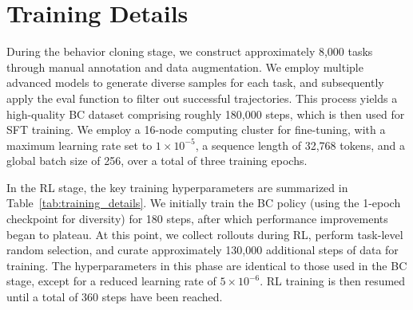 \section{Training Details}\label{apdx:training_details}
During the behavior cloning stage, we construct approximately 8,000 tasks through manual annotation and data augmentation. We employ multiple advanced models to generate diverse samples for each task, and subsequently apply the eval function to filter out successful trajectories. This process yields a high-quality BC dataset comprising roughly 180,000 steps, which is then used for SFT training. We employ a 16-node computing cluster for fine-tuning, with a maximum learning rate set to \(1 \times 10^{-5}\), a sequence length of 32,768 tokens, and a global batch size of 256, over a total of three training epochs.

In the RL stage, the key training hyperparameters are summarized in Table~\ref{tab:training_details}. We initially train the BC policy (using the 1-epoch checkpoint for diversity) for 180 steps, after which performance improvements began to plateau. 
At this point, we collect rollouts during RL, perform task-level random selection, and curate approximately 130,000 additional steps of data for \rlmethod training. 
The hyperparameters in this phase are identical to those used in the BC stage, except for a reduced learning rate of \(5 \times 10^{-6}\). RL training is then resumed until a total of 360 steps have been reached.



\newpage
\clearpage